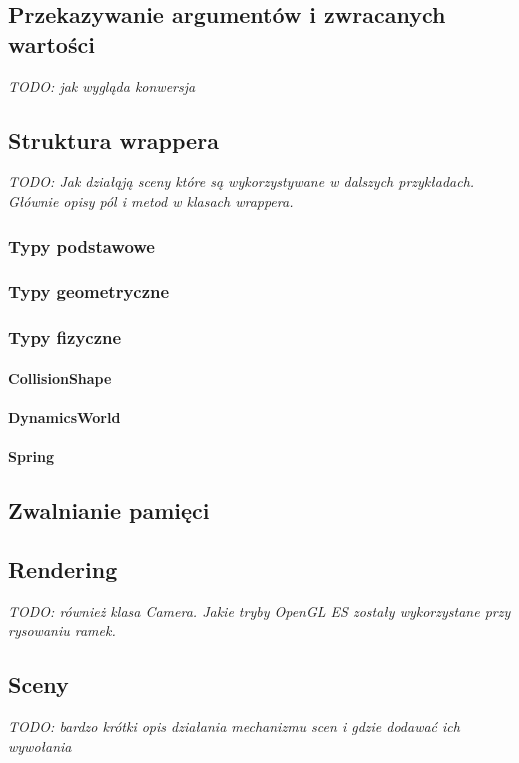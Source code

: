 \subsection{Przekazywanie argumentów i zwracanych wartości}
\emph{TODO: jak wygląda konwersja }

\subsection{Struktura wrappera}
\emph{TODO: Jak działąją sceny które są wykorzystywane w dalszych przykładach.
Głównie opisy pól i metod w klasach wrappera.}

\subsubsection{Typy podstawowe}

\subsubsection{Typy geometryczne}

\subsubsection{Typy fizyczne}

\paragraph{CollisionShape}

\paragraph{DynamicsWorld}

\paragraph{Spring}

\subsection{Zwalnianie pamięci}

\subsection{Rendering}
\emph{TODO: również klasa Camera. Jakie tryby OpenGL ES zostały wykorzystane
przy rysowaniu ramek.}

\subsection{Sceny}
\emph{TODO: bardzo krótki opis działania mechanizmu scen i gdzie dodawać ich
wywołania}

